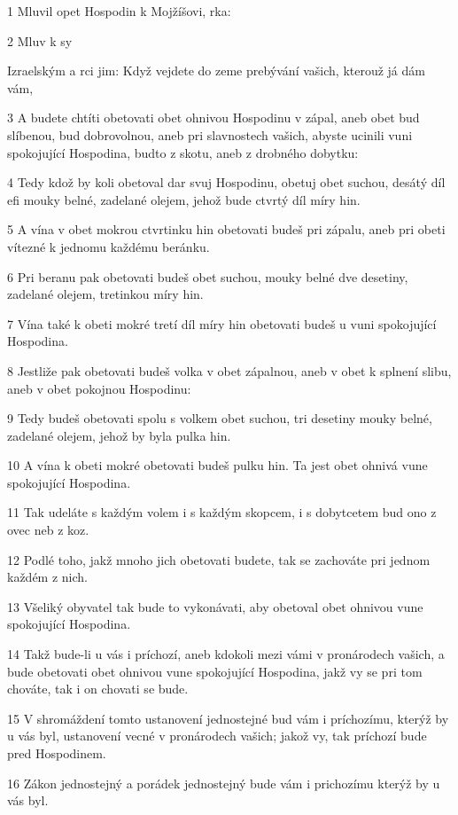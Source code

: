 \par 1 Mluvil opet Hospodin k Mojžíšovi, rka:
\par 2 Mluv k sy\par Izraelským a rci jim: Když vejdete do zeme prebývání vašich, kterouž já dám vám,
\par 3 A budete chtíti obetovati obet ohnivou Hospodinu v zápal, aneb obet bud slíbenou, bud dobrovolnou, aneb pri slavnostech vašich, abyste ucinili vuni spokojující Hospodina, budto z skotu, aneb z drobného dobytku:
\par 4 Tedy kdož by koli obetoval dar svuj Hospodinu, obetuj obet suchou, desátý díl efi mouky belné, zadelané olejem, jehož bude ctvrtý díl míry hin.
\par 5 A vína v obet mokrou ctvrtinku hin obetovati budeš pri zápalu, aneb pri obeti vítezné k jednomu každému beránku.
\par 6 Pri beranu pak obetovati budeš obet suchou, mouky belné dve desetiny, zadelané olejem, tretinkou míry hin.
\par 7 Vína také k obeti mokré tretí díl míry hin obetovati budeš u vuni spokojující Hospodina.
\par 8 Jestliže pak obetovati budeš volka v obet zápalnou, aneb v obet k splnení slibu, aneb v obet pokojnou Hospodinu:
\par 9 Tedy budeš obetovati spolu s volkem obet suchou, tri desetiny mouky belné, zadelané olejem, jehož by byla pulka hin.
\par 10 A vína k obeti mokré obetovati budeš pulku hin. Ta jest obet ohnivá vune spokojující Hospodina.
\par 11 Tak udeláte s každým volem i s každým skopcem, i s dobytcetem bud ono z ovec neb z koz.
\par 12 Podlé toho, jakž mnoho jich obetovati budete, tak se zachováte pri jednom každém z nich.
\par 13 Všeliký obyvatel tak bude to vykonávati, aby obetoval obet ohnivou vune spokojující Hospodina.
\par 14 Takž bude-li u vás i príchozí, aneb kdokoli mezi vámi v pronárodech vašich, a bude obetovati obet ohnivou vune spokojující Hospodina, jakž vy se pri tom chováte, tak i on chovati se bude.
\par 15 V shromáždení tomto ustanovení jednostejné bud vám i príchozímu, kterýž by u vás byl, ustanovení vecné v pronárodech vašich; jakož vy, tak príchozí bude pred Hospodinem.
\par 16 Zákon jednostejný a porádek jednostejný bude vám i prichozímu kterýž by u vás byl.
